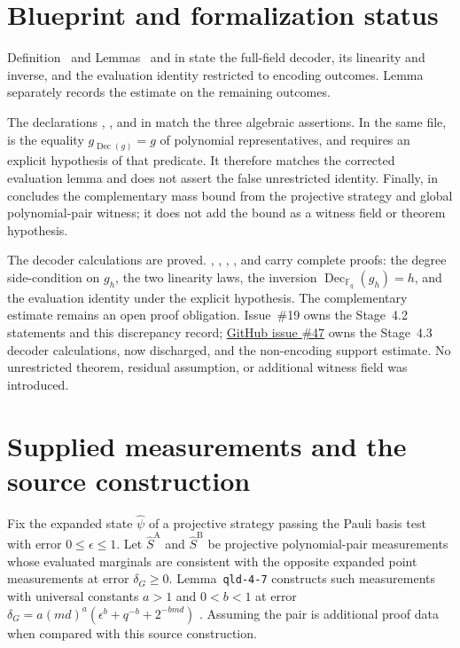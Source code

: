 \documentclass[11pt]{article}
\renewcommand{\ghissue}[1]{%
  \href{https://github.com/Dengnifer/MIPStarRE-A/issues/#1}{GitHub issue \##1}}
\begin{document}
\section{Blueprint and formalization status}

Definition~ and
Lemmas~ and
 in
 state the full-field
decoder, its linearity and inverse, and the evaluation identity restricted to
encoding outcomes.  Lemma~
separately records the estimate on the remaining outcomes.

The declarations , , and
 in
 match the three algebraic assertions.
In the same file,  is the equality
$g_{\operatorname{Dec}(g)}=g$ of polynomial representatives, and
 requires an explicit hypothesis
of that predicate.  It therefore matches the corrected evaluation lemma and
does not assert the false unrestricted identity.  Finally,
 in
 concludes the complementary
mass bound from the projective strategy and global polynomial-pair witness; it
does not add the bound as a witness field or theorem hypothesis.

The decoder calculations are proved.  ,
, , ,
and  carry complete proofs: the degree
side-condition on $g_h$, the two linearity laws, the inversion
$\operatorname{Dec}_{\mathbb F_q}(g_h)=h$, and the evaluation identity under the
explicit  hypothesis.  The complementary estimate
 remains an open proof obligation.
Issue~\#19 owns the Stage~4.2 statements and this discrepancy record;
\ghissue{47} owns the Stage~4.3 decoder calculations, now discharged, and the
non-encoding support estimate.  No unrestricted theorem, residual assumption, or
additional witness field was introduced.

\section{Supplied measurements and the source construction}

Fix the expanded state $\widehat\psi$ of a projective strategy passing the
Pauli basis test with error $0\leq\epsilon\leq1$. Let
$\widehat S^{\mathrm A}$ and $\widehat S^{\mathrm B}$ be projective
polynomial-pair measurements whose evaluated marginals are consistent with
the opposite expanded point measurements at error $\delta_G\geq0$.
Lemma~\texttt{qld-4-7} constructs such measurements with universal constants
$a>1$ and $0<b<1$ at error
$\delta_G=a(md)^a(\epsilon^b+q^{-b}+2^{-bmd})$
\cite[lines~1267--1274]{Ji2020MIPStar}. Assuming the pair is additional proof
data when compared with this source construction.
\end{document}
